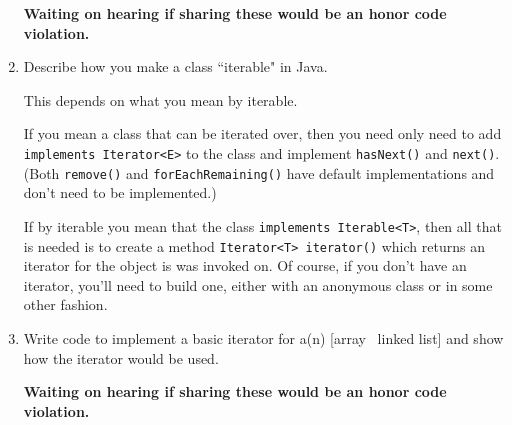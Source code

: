 \documentclass[10pt]{article}
\begin{document}
\begin{enumerate}[leftmargin=0em]
    \textbf{Waiting on hearing if sharing these would be an honor code violation.}
    \item Describe how you make a class ``iterable" in Java.
    
    This depends on what you mean by iterable.
    
    If you mean a class that can be iterated over, then you need only need to add \texttt{implements Iterator<E>} to the class and implement \texttt{hasNext()} and \texttt{next()}. (Both \texttt{remove()} and \texttt{forEachRemaining()} have default implementations and don't need to be implemented.)

    If by iterable you mean that the class \texttt{implements Iterable<T>}, then all that is needed is to create a method \texttt{Iterator<T> iterator()} which returns an iterator for the object is was invoked on. Of course, if you don't have an iterator, you'll need to build one, either with an anonymous class or in some other fashion.
    \item Write code to implement a basic iterator for a(n) [array \vline\ linked list] and show how the iterator would be used.
    
    \textbf{Waiting on hearing if sharing these would be an honor code violation.}
\end{enumerate}
\end{document}
